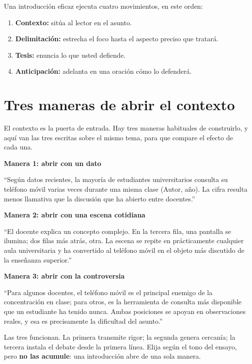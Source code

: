 \documentclass[12pt,a4paper,openany]{report}
\newenvironment{ejemplo}[1]
	{\begin{lrbox}{\cajaguardada}\begin{minipage}{\dimexpr\textwidth-2\fboxsep\relax}\vspace{4pt}\textcolor{verdeejemplo}{\textbf{\sffamily\small #1}}\par\vspace{3pt}\small}
	{\vspace{4pt}\end{minipage}\end{lrbox}\par\vspace{4pt}\noindent\colorbox{cremaejemplo}{\usebox{\cajaguardada}}\par\vspace{8pt}}
\begin{document}
Una introducci\'on eficaz ejecuta cuatro movimientos, en este orden:

\begin{enumerate}[label=\textbf{\arabic*.},leftmargin=1.2cm]
	\item \textbf{Contexto:} sit\'ua al lector en el asunto.
	\item \textbf{Delimitaci\'on:} estrecha el foco hasta el aspecto preciso que tratar\'a.
	\item \textbf{Tesis:} enuncia lo que usted defiende.
	\item \textbf{Anticipaci\'on:} adelanta en una oraci\'on c\'omo lo defender\'a.
\end{enumerate}

\section{Tres maneras de abrir el contexto}

El contexto es la puerta de entrada. Hay tres maneras habituales de construirlo, y aqu\'i van las tres escritas sobre el mismo tema, para que compare el efecto de cada una.

\begin{ejemplo}{Manera 1: abrir con un dato}
``Seg\'un datos recientes, la mayor\'ia de estudiantes universitarios consulta su tel\'efono m\'ovil varias veces durante una misma clase (Autor, a\~no). La cifra resulta menos llamativa que la discusi\'on que ha abierto entre docentes.''
\end{ejemplo}

\begin{ejemplo}{Manera 2: abrir con una escena cotidiana}
``El docente explica un concepto complejo. En la tercera fila, una pantalla se ilumina; dos filas m\'as atr\'as, otra. La escena se repite en pr\'acticamente cualquier aula universitaria y ha convertido al tel\'efono m\'ovil en el objeto m\'as discutido de la ense\~nanza superior.''
\end{ejemplo}

\begin{ejemplo}{Manera 3: abrir con la controversia}
``Para algunos docentes, el tel\'efono m\'ovil es el principal enemigo de la concentraci\'on en clase; para otros, es la herramienta de consulta m\'as disponible que un estudiante ha tenido nunca. Ambas posiciones se apoyan en observaciones reales, y esa es precisamente la dificultad del asunto.''
\end{ejemplo}

Las tres funcionan. La primera transmite rigor; la segunda genera cercan\'ia; la tercera instala el debate desde la primera l\'inea. Elija seg\'un el tono del ensayo, pero \textbf{no las acumule}: una introducci\'on abre de una sola manera.
\end{document}
